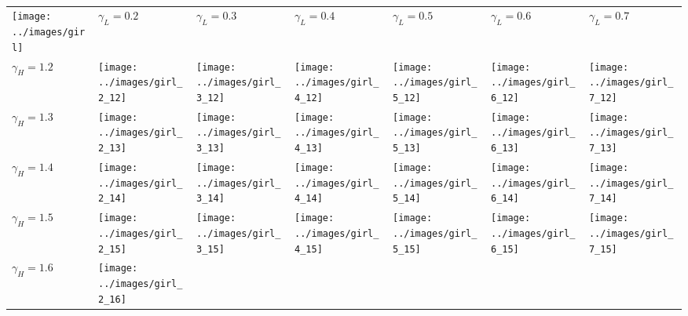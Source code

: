 
~\vfill
{}
\begin{tabular}{ T S @{} S @{} S @{} S @{} S @{} S }
  \centering
  \texttt{[image: ../images/girl]}
  & $\gamma_L=0.2$ & $\gamma_L=0.3$ & $\gamma_L=0.4$ & $\gamma_L=0.5$ & $\gamma_L=0.6$ & $\gamma_L=0.7$ \\
  $\gamma_H=1.2$
  & \texttt{[image: ../images/girl\_2\_12]}
  & \texttt{[image: ../images/girl\_3\_12]}
  & \texttt{[image: ../images/girl\_4\_12]}
  & \texttt{[image: ../images/girl\_5\_12]}
  & \texttt{[image: ../images/girl\_6\_12]}
  & \texttt{[image: ../images/girl\_7\_12]} \\ [-4pt]
  $\gamma_H=1.3$
  & \texttt{[image: ../images/girl\_2\_13]}
  & \texttt{[image: ../images/girl\_3\_13]}
  & \texttt{[image: ../images/girl\_4\_13]}
  & \texttt{[image: ../images/girl\_5\_13]}
  & \texttt{[image: ../images/girl\_6\_13]}
  & \texttt{[image: ../images/girl\_7\_13]} \\ [-4pt]
  $\gamma_H=1.4$
  & \texttt{[image: ../images/girl\_2\_14]}
  & \texttt{[image: ../images/girl\_3\_14]}
  & \texttt{[image: ../images/girl\_4\_14]}
  & \texttt{[image: ../images/girl\_5\_14]}
  & \texttt{[image: ../images/girl\_6\_14]}
  & \texttt{[image: ../images/girl\_7\_14]} \\ [-4pt]
  $\gamma_H=1.5$
  & \texttt{[image: ../images/girl\_2\_15]}
  & \texttt{[image: ../images/girl\_3\_15]}
  & \texttt{[image: ../images/girl\_4\_15]}
  & \texttt{[image: ../images/girl\_5\_15]}
  & \texttt{[image: ../images/girl\_6\_15]}
  & \texttt{[image: ../images/girl\_7\_15]} \\ [-4pt]
  $\gamma_H=1.6$
  & \texttt{[image: ../images/girl\_2\_16]}

\end{tabular}
